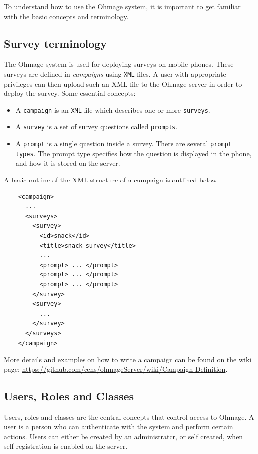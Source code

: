 \documentclass{scrartcl}
\begin{document}
To understand how to use the Ohmage system, it is important to get familiar with
the basic concepts and terminology.  

\subsection{Survey terminology}

The Ohmage system is used for deploying surveys on mobile phones. These surveys
are defined in \emph{campaigns} using \texttt{XML} files. A user with
appropriate privileges can then upload such an XML file to the Ohmage server in
order to deploy the survey. Some essential concepts:

\begin{itemize}
  \item A \texttt{campaign} is an \texttt{XML} file which describes one or more
  \texttt{surveys}. 
  \item A \texttt{survey} is a set of survey questions called \texttt{prompts}.
  \item A \texttt{prompt} is a single question inside a survey. There are
  several \texttt{prompt types}. The prompt type specifies how the question is
  displayed in the phone, and how it is stored on the server.
\end{itemize}

\noindent A basic outline of the XML structure of a campaign is outlined below.

\begin{verbatim}
    <campaign>
      ... 
      <surveys>
        <survey>
          <id>snack</id>
          <title>snack survey</title>
          ...
          <prompt> ... </prompt>
          <prompt> ... </prompt>
          <prompt> ... </prompt>
        </survey>
        <survey>
          ...
        </survey>
      </surveys>
    </campaign>
\end{verbatim}

\noindent More details and examples on how to write a campaign can be found on
the wiki page:
\url{https://github.com/cens/ohmageServer/wiki/Campaign-Definition}.

\subsection{Users, Roles and Classes}
Users, roles and classes are the central concepts that control access to Ohmage.
A user is a person who can authenticate with the system and perform certain
actions. Users can either be created by an administrator, or self created,
when self registration is enabled on the server.\\
\end{document}

